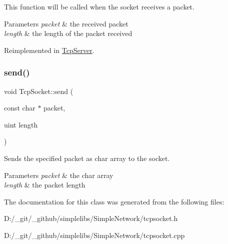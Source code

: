 This function will be called when the socket receives a packet. 


\begin{DoxyParams}{Parameters}
{\em packet} & the received packet \\
\hline
{\em length} & the length of the packet received \\
\hline
\end{DoxyParams}


Reimplemented in \mbox{\hyperlink{class_tcp_server_a4a506d4903c2a5ef92ed1ef5542fdedb}{Tcp\+Server}}.

\mbox{\label{class_tcp_socket_a9e62b6ef15b2e10d2aa8316439651cd3}} 
\subsubsection{\texorpdfstring{send()}{send()}}
{\footnotesize\ttfamily void Tcp\+Socket\+::send (\begin{DoxyParamCaption}\item[{const char $\ast$}]{packet,  }\item[{uint}]{length }\end{DoxyParamCaption})}



Sends the specified packet as char array to the socket. 


\begin{DoxyParams}{Parameters}
{\em packet} & the char array \\
\hline
{\em length} & the packet length \\
\hline
\end{DoxyParams}


The documentation for this class was generated from the following files\+:\begin{DoxyCompactItemize}
\item 
D\+:/\+\_\+git/\+\_\+github/simplelibs/\+Simple\+Network/tcpsocket.\+h\item 
D\+:/\+\_\+git/\+\_\+github/simplelibs/\+Simple\+Network/tcpsocket.\+cpp\end{DoxyCompactItemize}
